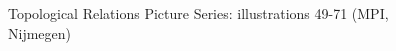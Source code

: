 \begin{figure}
\qquad
{}
\caption[TRPS 49-71]{Topological Relations Picture Series: illustrations
 49-71  (\textcopyright MPI, Nijmegen) \cite[574-75]{Levi06}
\label{fig:TRPS-49-71}}
\end{figure}



